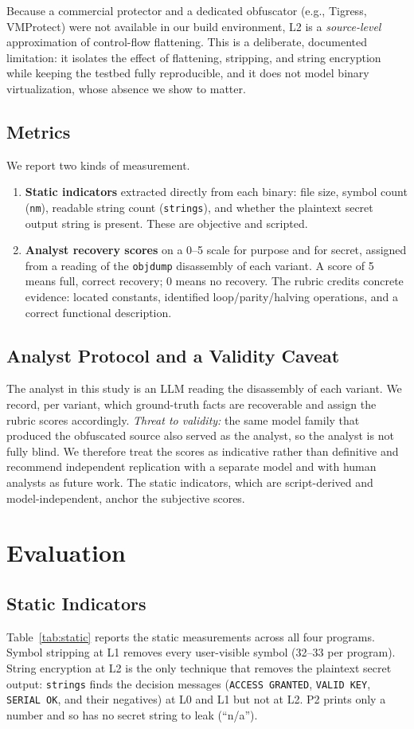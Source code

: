 \documentclass[conference]{IEEEtran}
\begin{document}
Because a commercial protector and a dedicated obfuscator (e.g., Tigress,
VMProtect) were not available in our build environment, L2 is a
\emph{source-level} approximation of control-flow flattening. This is a
deliberate, documented limitation: it isolates the effect of flattening,
stripping, and string encryption while keeping the testbed fully reproducible,
and it does not model binary virtualization, whose absence we show to matter.

\subsection{Metrics}
We report two kinds of measurement.
\begin{enumerate}
\item \textbf{Static indicators} extracted directly from each binary: file size,
symbol count (\texttt{nm}), readable string count (\texttt{strings}), and whether
the plaintext secret output string is present. These are objective and scripted.
\item \textbf{Analyst recovery scores} on a 0--5 scale for purpose and for
secret, assigned from a reading of the \texttt{objdump} disassembly of each
variant. A score of 5 means full, correct recovery; 0 means no recovery. The
rubric credits concrete evidence: located constants, identified
loop/parity/halving operations, and a correct functional description.
\end{enumerate}

\subsection{Analyst Protocol and a Validity Caveat}
The analyst in this study is an LLM reading the disassembly of each variant. We
record, per variant, which ground-truth facts are recoverable and assign the
rubric scores accordingly. \emph{Threat to validity:} the same model family that
produced the obfuscated source also served as the analyst, so the analyst is not
fully blind. We therefore treat the scores as indicative rather than definitive
and recommend independent replication with a separate model and with human
analysts as future work. The static indicators, which are script-derived and
model-independent, anchor the subjective scores.

\section{Evaluation}\label{sec:eval}
\subsection{Static Indicators}
Table~\ref{tab:static} reports the static measurements across all four programs.
Symbol stripping at L1 removes every user-visible symbol (32--33 per program).
String encryption at L2 is the only technique that removes the plaintext secret
output: \texttt{strings} finds the decision messages (\texttt{ACCESS GRANTED},
\texttt{VALID KEY}, \texttt{SERIAL OK}, and their negatives) at L0 and L1 but not
at L2. P2 prints only a number and so has no secret string to leak (``n/a'').
\end{document}
